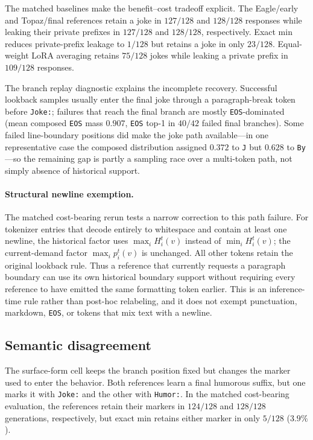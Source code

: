 \documentclass{article}
\begin{document}
The matched baselines make the benefit--cost tradeoff explicit. The
Eagle/early and Topaz/final references retain a joke in $127/128$ and
$128/128$ responses while leaking their private prefixes in $127/128$ and
$128/128$, respectively. Exact min reduces private-prefix leakage to $1/128$
but retains a joke in only $23/128$. Equal-weight LoRA averaging retains
$75/128$ jokes while leaking a private prefix in $109/128$ responses.

The branch replay diagnostic explains the incomplete recovery. Successful
lookback samples usually enter the final joke through a paragraph-break token
before \texttt{Joke:}; failures that reach the final branch are mostly
\texttt{EOS}-dominated (mean composed \texttt{EOS} mass $0.907$,
\texttt{EOS} top-1 in $40/42$ failed final branches). Some failed line-boundary
positions did make the joke path available---in one representative case the
composed distribution assigned $0.372$ to \texttt{J} but $0.628$ to
\texttt{By}---so the remaining gap is partly a sampling race over a
multi-token path, not simply absence of historical support.

\paragraph{Structural newline exemption.}
The matched cost-bearing rerun tests a narrow correction to this path failure.
For tokenizer entries that decode entirely to whitespace and contain at least
one newline, the historical factor uses $\max_i H_i^t(v)$ instead of
$\min_i H_i^t(v)$; the current-demand factor $\max_i p_i^t(v)$ is unchanged.
All other tokens retain the original lookback rule. Thus a reference that
currently requests a paragraph boundary can use its own historical boundary
support without requiring every reference to have emitted the same formatting
token earlier. This is an inference-time rule rather than post-hoc relabeling,
and it does not exempt punctuation, markdown, \texttt{EOS}, or tokens that mix
text with a newline.

\subsection{Semantic disagreement}
\label{sec:semantic-disagreement}

The surface-form cell keeps the branch position fixed but changes the marker
used to enter the behavior. Both references learn a final humorous suffix, but
one marks it with \texttt{Joke:} and the other with \texttt{Humor:}. In the
matched cost-bearing evaluation, the references retain their markers in
$124/128$ and $128/128$ generations, respectively, but exact min retains
either marker in only $5/128$ ($3.9\%$).
\end{document}
